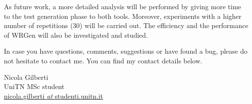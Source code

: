 

As future work, a more detailed analysis will be performed by giving more time to the test generation phase to both tools. Moreover, experiments with a higher number of repetitions (30) will be carried out. The efficiency and the performance of WRGen will also be investigated and studied.


In case you have questions, comments, suggestions or have found a bug, please do not hesitate to contact me. You can find my contact details below.

  \begin{center}
    Nicola Gilberti\\
    UniTN MSc student\\
    
    \href{mailto:nicola.gilberti@studenti.unitn.it}{\footnotesize nicola.gilberti \textit{at} studenti.unitn.it}
  \end{center}

\newpage
